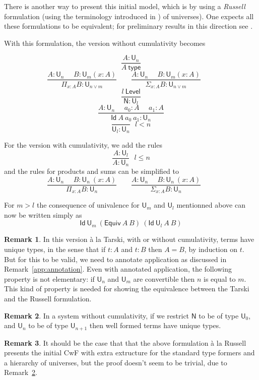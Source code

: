 \documentclass[11pt,a4paper]{article}
\theoremstyle{definition}
\newtheorem{remark}{Remark}
\newcommand{\Id}{\mathsf{Id}}
\newcommand{\NN}{\mathsf{N}}
\newcommand{\UU}{\mathsf{U}}
\newcommand{\Level}{\mathsf{Level}}
\newcommand{\type}{\mathsf{type}}
\newcommand{\mypi}[3]{\Pi_{#1:#2}#3}
\newcommand{\mysig}[3]{\Sigma_{#1:#2}#3}
\newcommand{\Equiv}{\mathsf{Equiv}}
\begin{document}
\medskip

There is another way to present this initial model, which is by using
a {\em Russell} formulation (using the terminology introduced in \cite{martinlof:padova}) of
universes). One expects all these formulations to be equivalent; for preliminary results in this
direction see \cite{Assaf14,Thire20}.

With this formulation, the version without cumulativity becomes

$$
\frac{A:\UU_{n}}{A~\type}
$$
$$
\frac{A:\UU_{n}~~~~~~B:\UU_m(x:A)}
     {\mypi{x}{A}{B}:\UU_{n\vee m}}~~~~~~~~~
\frac{A:\UU_{n}~~~~~~B:\UU_m(x:A)}
     {\mysig{x}{A}{B}:\UU_{n\vee m}}~~~~~~~~~
$$
$$\frac{l~\Level}{\NN:\UU_{l}}$$
$$
\frac{A:\UU_n~~~~~~a_0:A~~~~~~a_1:A}
{\Id~A~a_0~a_1:\UU_n}
$$
$$
\frac{}{{\UU_l}:\UU_{n}}{~~~l<n}
$$

\medskip

For the version with cumulativity, we add the rules
$$
\frac{A:\UU_{l}}{A:\UU_{n}}{~~~l\leqslant n}
$$
and the rules for products and sums can be simplified to
$$
\frac{A:\UU_{n}~~~~~~B:\UU_n~(x:A)}
     {\mypi{x}{A}{B}:\UU_{n}}~~~~~~~~~
\frac{A:\UU_{n}~~~~~~B:\UU_n~(x:A)}
     {\mysig{x}{A}{B}:\UU_{n}}~~~~~~~~~
$$

     For $m>l$ the consequence of univalence for $\UU_m$ and $\UU_l$ mentionned above can now be written
     simply as
     $$\Id~\UU_m~(\Equiv~A~B)~(\Id~\UU_l~A~B)$$



\begin{remark}
  In this version \`a la Tarski, with or without cumulativity, terms have unique types, in the sense that if $t : A$ and $t : B$ then $A = B$, by induction on $t$. But for this to be valid, we need to annotate application as discussed in Remark~\ref{app:annotation}.
  Even with annotated application, the following property is not elementary: if $\UU_n$ and $\UU_m$ are convertible then $n$ is equal to $m$. This kind of property is needed for showing the equivalence between the Tarski and the Russell formulation.
\end{remark}

\begin{remark} \label{uniqueness:without:cumulativity}
  In a system without cumulativity, if we restrict $\NN$ to be of type $\UU_0$, and $\UU_n$ to be of type $\UU_{n+1}$ then well formed terms have unique types.
\end{remark}

\begin{remark}
  It should be the case that that the above formulation \`a la Russell presents the initial CwF with extra extructure for the standard type formers and a hierarchy of universes, but the proof doesn't seem to be trivial, due to Remark~\ref{uniqueness:without:cumulativity}.
\end{remark}
\end{document}
